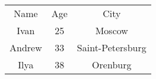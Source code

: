 \begin{tabular}{ |c|c|c| }
\hline
Name & Age & City \\
Ivan & 25 & Moscow \\
Andrew & 33 & Saint-Petersburg \\
Ilya & 38 & Orenburg \\
\end{tabular}